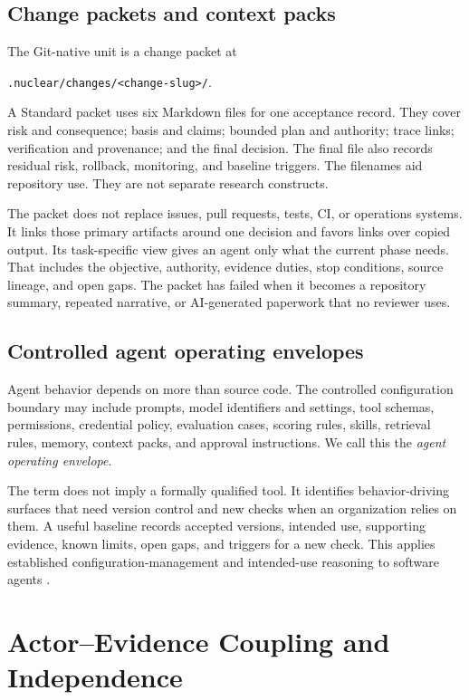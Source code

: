 \documentclass[11pt]{article}
\newcommand{\code}[1]{\texttt{#1}}
\begin{document}
\subsection{Change packets and context packs}

The Git-native unit is a change packet at

\begin{center}
\code{.nuclear/changes/<change-slug>/}.
\end{center}

A Standard packet uses six Markdown files for one acceptance record. They cover risk and consequence; basis and claims; bounded plan and authority; trace links; verification and provenance; and the final decision. The final file also records residual risk, rollback, monitoring, and baseline triggers. The filenames aid repository use. They are not separate research constructs.

The packet does not replace issues, pull requests, tests, CI, or operations systems. It links those primary artifacts around one decision and favors links over copied output. Its task-specific view gives an agent only what the current phase needs. That includes the objective, authority, evidence duties, stop conditions, source lineage, and open gaps. The packet has failed when it becomes a repository summary, repeated narrative, or AI-generated paperwork that no reviewer uses.

\subsection{Controlled agent operating envelopes}

Agent behavior depends on more than source code. The controlled configuration boundary may include prompts, model identifiers and settings, tool schemas, permissions, credential policy, evaluation cases, scoring rules, skills, retrieval rules, memory, context packs, and approval instructions. We call this the \emph{agent operating envelope}.

The term does not imply a formally qualified tool. It identifies behavior-driving surfaces that need version control and new checks when an organization relies on them. A useful baseline records accepted versions, intended use, supporting evidence, known limits, open gaps, and triggers for a new check. This applies established configuration-management and intended-use reasoning to software agents \citep{doe2016cm,nasa2022swe136}.

\section{Actor--Evidence Coupling and Independence}
\label{sec:independence}
\end{document}
